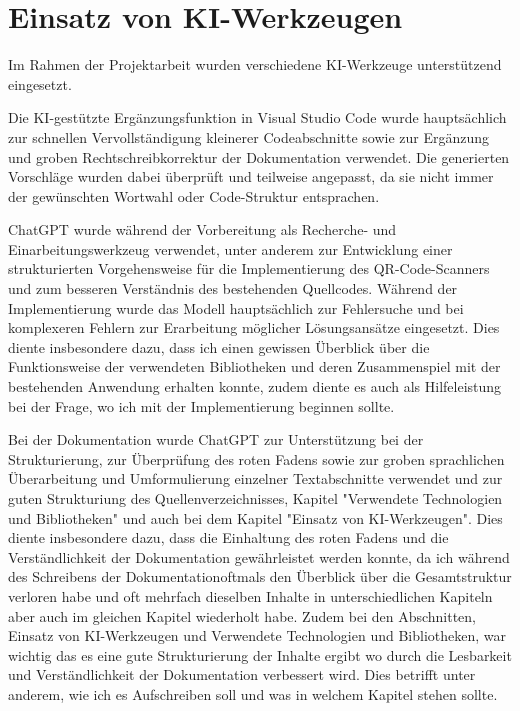 ﻿\documentclass[oneside]{ausarbeitung}
\begin{document}
\chapter{Einsatz von KI-Werkzeugen}
\label{cha:ki-nutzung}

Im Rahmen der Projektarbeit wurden verschiedene KI-Werkzeuge unterstützend eingesetzt.

Die KI-gestützte Ergänzungsfunktion in Visual Studio Code wurde hauptsächlich zur schnellen Vervollständigung kleinerer
Codeabschnitte sowie zur Ergänzung und groben Rechtschreibkorrektur der Dokumentation verwendet. Die generierten Vorschläge 
wurden dabei überprüft und teilweise angepasst, da sie nicht immer der gewünschten Wortwahl oder Code-Struktur entsprachen.

ChatGPT wurde während der Vorbereitung als Recherche- und Einarbeitungswerkzeug verwendet, unter anderem zur Entwicklung einer 
strukturierten Vorgehensweise für die Implementierung des QR-Code-Scanners und zum besseren Verständnis des bestehenden Quellcodes. 
Während der Implementierung wurde das Modell hauptsächlich zur Fehlersuche und bei komplexeren Fehlern zur Erarbeitung möglicher 
Lösungsansätze eingesetzt. Dies diente insbesondere dazu, dass ich einen gewissen Überblick über die Funktionsweise der verwendeten
Bibliotheken und deren Zusammenspiel mit der bestehenden Anwendung erhalten konnte, zudem diente es auch als Hilfeleistung
bei der Frage, wo ich mit der Implementierung beginnen sollte.

Bei der Dokumentation wurde ChatGPT zur Unterstützung bei der Strukturierung, zur Überprüfung des roten Fadens sowie zur groben 
sprachlichen Überarbeitung und Umformulierung einzelner Textabschnitte verwendet und zur guten Strukturiung des Quellenverzeichnisses,
Kapitel "Verwendete Technologien und Bibliotheken" und auch bei dem Kapitel "Einsatz von KI-Werkzeugen". Dies diente insbesondere dazu, 
dass die Einhaltung des roten Fadens und die Verständlichkeit der Dokumentation gewährleistet werden konnte, da ich während des Schreibens 
der Dokumentationoftmals den Überblick über die Gesamtstruktur verloren habe und oft mehrfach dieselben Inhalte in unterschiedlichen 
Kapiteln aber auch im gleichen Kapitel wiederholt habe. Zudem bei den Abschnitten, Einsatz von KI-Werkzeugen und Verwendete Technologien 
und Bibliotheken, war wichtig das es eine gute Strukturierung der Inhalte ergibt wo durch die Lesbarkeit und Verständlichkeit der Dokumentation
verbessert wird. Dies betrifft unter anderem, wie ich es Aufschreiben soll und was in welchem Kapitel stehen sollte.


\printbibliography[heading=bibintoc]
\end{document}
